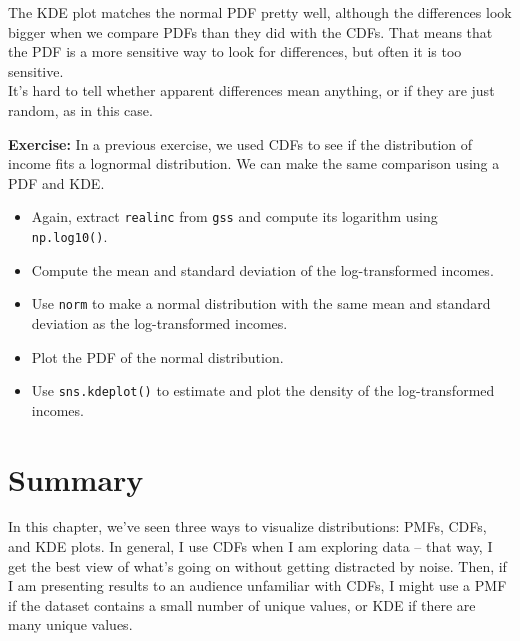 The KDE plot matches the normal PDF pretty well, although the
differences look bigger when we compare PDFs than they did with the
CDFs. That means that the PDF is a more sensitive way to look for
differences, but often it is too sensitive.\\
It's hard to tell whether apparent differences mean anything, or if they
are just random, as in this case.

\textbf{Exercise:} In a previous exercise, we used CDFs to see if the
distribution of income fits a lognormal distribution. We can make the
same comparison using a PDF and KDE.

\begin{itemize}
\item
  Again, extract \passthrough{\lstinline!realinc!} from
  \passthrough{\lstinline!gss!} and compute its logarithm using
  \passthrough{\lstinline!np.log10()!}.
\item
  Compute the mean and standard deviation of the log-transformed
  incomes.
\item
  Use \passthrough{\lstinline!norm!} to make a normal distribution with
  the same mean and standard deviation as the log-transformed incomes.
\item
  Plot the PDF of the normal distribution.
\item
  Use \passthrough{\lstinline!sns.kdeplot()!} to estimate and plot the
  density of the log-transformed incomes.
\end{itemize}

\hypertarget{summary}{%
\section{Summary}\label{summary}}

In this chapter, we've seen three ways to visualize distributions: PMFs,
CDFs, and KDE plots. In general, I use CDFs when I am exploring data --
that way, I get the best view of what's going on without getting
distracted by noise. Then, if I am presenting results to an audience
unfamiliar with CDFs, I might use a PMF if the dataset contains a small
number of unique values, or KDE if there are many unique values.

